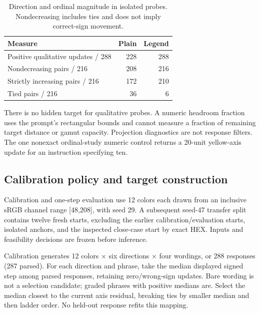 \begin{table}[H]
\centering\small
\begin{tabular}{@{}lrr@{}}
\toprule
Measure & Plain & Legend \\
\midrule
Positive qualitative updates / 288 & 228 & 288 \\
Nondecreasing pairs / 216 & 208 & 216 \\
Strictly increasing pairs / 216 & 172 & 210 \\
Tied pairs / 216 & 36 & 6 \\
\bottomrule
\end{tabular}
\caption{Direction and ordinal magnitude in isolated probes.
Nondecreasing includes ties and does not imply correct-sign movement.}
\end{table}

There is no hidden target for qualitative probes. A numeric headroom fraction
uses the prompt's rectangular bounds and cannot measure a fraction of remaining
target distance or gamut capacity. Projection diagnostics are not response
filters. The one nonexact ordinal-study numeric control returns a 20-unit
yellow-axis update for an instruction specifying ten.

\subsection{Calibration policy and target construction}
Calibration and one-step evaluation use 12 colors each drawn from an inclusive
sRGB channel range [48,208], with seed 29. A subsequent seed-47 transfer split
contains twelve fresh starts, excluding the earlier calibration/evaluation
starts, isolated anchors, and the inspected close-case start by exact HEX.
Inputs and feasibility decisions are frozen before inference.

Calibration generates 12 colors $\times$ six directions $\times$ four
wordings, or 288 responses (287 parsed). For each direction and phrase,
take the median displayed signed step among parsed responses, retaining
zero/wrong-sign updates. Bare wording is not a selection candidate;
graded phrases with positive medians are. Select the median closest to the
current axis residual, breaking ties by smaller median and then ladder order.
No held-out response refits this mapping.

